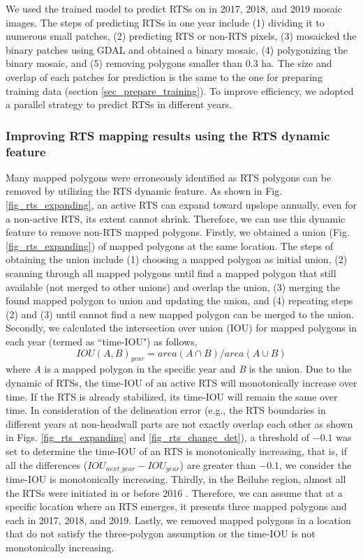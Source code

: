 \documentclass[authoryear,preprint,review,12pt]{elsarticle}
\begin{document}
We used the trained model to predict RTSs on in 2017, 2018, and 2019 mosaic images. 
The steps of predicting RTSs in one year include (1) dividing it to numerous small patches, 
(2) predicting RTS or non-RTS pixels, 
(3) mosaicked the binary patches using GDAL and obtained a binary mosaic, 
(4) polygonizing the binary mosaic, and 
(5) removing polygons smaller than 0.3 ha. 
The size and overlap of each patches for prediction is the same to the one for preparing training data (section \ref{sec_prepare_training}). 
To improve efficiency, we adopted a parallel strategy to predict RTSs in different years.


\subsubsection{Improving RTS mapping results using the RTS dynamic feature}
\label{sec_improving_using_rts_dynamic}

Many mapped polygons were erroneously identified as RTS polygons can be removed by utilizing the RTS dynamic feature. 
As shown in Fig. \ref{fig_rts_expanding}, an active RTS can expand toward upslope annually, even for a non-active RTS, its extent cannot shrink. 
Therefore, we can use this dynamic feature to remove non-RTS mapped polygons. 
Firstly, we obtained a union (Fig. \ref{fig_rts_expanding}) of mapped polygons at the same location.
The steps of obtaining the union include (1) choosing a mapped polygon as initial union, (2) scanning through all mapped polygons until find a mapped polygon that still available (not merged to other unions) and overlap the union, (3) merging the found mapped polygon to union and updating the union, and (4) repeating steps (2) and (3) until cannot find a new mapped polygon can be merged to the union. 
Secondly, we calculated the intersection over union (IOU) for mapped polygons in each year (termed as ``time-IOU") as follows, 
\begin{equation}
IOU(A,B)_{year}=area(A \cap B)/area(A \cup B)
\label{equ_time_iou}
\end{equation}
where \emph{A} is a mapped polygon in the specific year and \emph{B} is the union. 
Due to the dynamic of RTSs, the time-IOU of an active RTS will monotonically increase over time. 
If the RTS is already stabilized, its time-IOU will remain the same over time. 
In consideration of the delineation error (e.g., the RTS boundaries in different years at non-headwall parts are not exactly overlap each other as shown in Figs. \ref{fig_rts_expanding} and \ref{fig_rts_change_det}), a threshold of $-0.1$ was set to determine the time-IOU of an RTS is monotonically increasing, that is, if all the differences ($IOU_{next\_year}-IOU_{year}$) are greater than $-0.1$, we consider the time-IOU is monotonically increasing. 
Thirdly, in the Beiluhe region, almost all the RTSs were initiated in or before 2016 \citep{luo2019recent}.
Therefore, we can assume that at a specific location where an RTS emerges, it presents three mapped polygons and each in 2017, 2018, and 2019. 
Lastly, we removed mapped polygons in a location that do not satisfy the three-polygon assumption or the time-IOU is not monotonically increasing.
 
\end{document}
